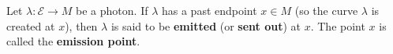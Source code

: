 Let $\lambda: \mathcal{E} \rightarrow M$ be a photon. If $\lambda$ has a past endpoint $x \in M$ (so the curve $\lambda$ is created at $x$), then $\lambda$ is said to be \textbf{emitted} (or \textbf{sent out}) at $x$. The point $x$ is called the \textbf{emission point}.
